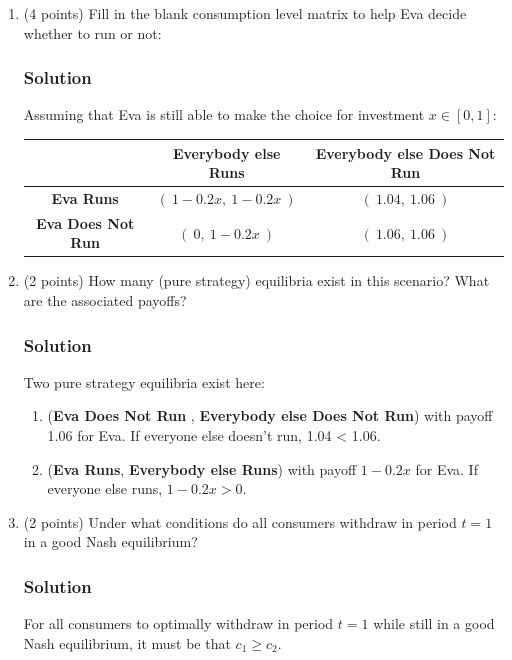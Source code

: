 \documentclass[12pt]{article}
\begin{document}
\begin{enumerate}[label=(\alph*)]
    \item (4 points) Fill in the blank consumption level matrix to help Eva decide whether to run or not:
    \subsubsection*{Solution}

    Assuming that Eva is still able to make the choice for investment $x \in [0,1]$:    
    \begin{center}
        \begin{tabular}{|c|c|c|}
            \hline
            & \textbf{Everybody else Runs} & \textbf{Everybody else Does Not Run} \\
            \hline
            \textbf{Eva Runs} & $(\ 1-0.2x,\ 1-0.2x\ )$ & $(\ 1.04,\ 1.06\ )$ \\
            \hline
            \textbf{Eva Does Not Run} & $(\ 0 ,\ 1-0.2x\ )$ & $(\ 1.06 ,\ 1.06\ )$ \\
            \hline
        \end{tabular}
    \end{center}

    \item (2 points) How many (pure strategy) equilibria exist in this scenario? What are the associated payoffs?
    \subsubsection*{Solution}

    Two pure strategy equilibria exist here: 
    \begin{enumerate}
        \item (\textbf{Eva Does Not Run} , \textbf{Everybody else Does Not Run}) with payoff 1.06 for Eva. If everyone else doesn't run, 1.04 < 1.06.
        \item (\textbf{Eva Runs}, \textbf{Everybody else Runs}) with payoff $1-0.2x$ for Eva. If everyone else runs, $1-0.2x > 0.$
    \end{enumerate}

    \item (2 points) Under what conditions do all consumers withdraw in period $t = 1$ in a good Nash equilibrium?
    \subsubsection*{Solution}

    For all consumers to optimally withdraw in period $t = 1$ while still in a good Nash equilibrium, it must be that $c_1 \geq c_2.$
    
\end{enumerate}
\end{document}
